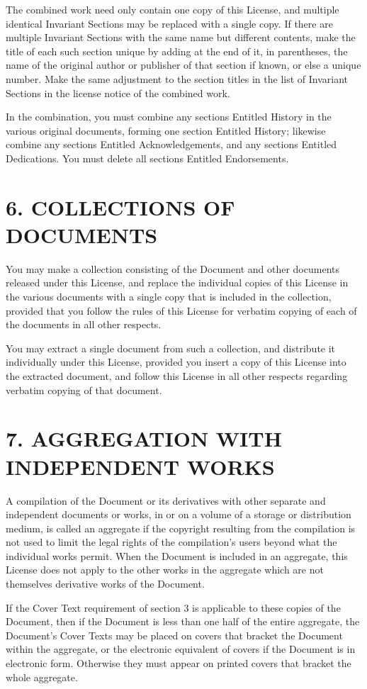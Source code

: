 \documentclass[captions=tableheading]{scrbook}
\begin{document}
The combined work need only contain one copy of this License, and multiple identical Invariant Sections may be replaced with a single copy. If there are multiple Invariant Sections with the same name but different contents, make the title of each such section unique by adding at the end of it, in parentheses, the name of the original author or publisher of that section if known, or else a unique number. Make the same adjustment to the section titles in the list of Invariant Sections in the license notice of the combined work.

In the combination, you must combine any sections Entitled History in the various original documents, forming one section Entitled History;
likewise combine any sections Entitled Acknowledgements, and any sections Entitled Dedications. You must delete all sections Entitled Endorsements.
\section{6. COLLECTIONS OF DOCUMENTS}
\label{sec-3-7}


You may make a collection consisting of the Document and other documents released under this License, and replace the individual copies of this License in the various documents with a single copy that is included in the collection, provided that you follow the rules of this License for verbatim copying of each of the documents in all other respects. 

You may extract a single document from such a collection, and distribute it individually under this License, provided you insert a copy of this License into the extracted document, and follow this License in all other respects regarding verbatim copying of that document.
\section{7. AGGREGATION WITH INDEPENDENT WORKS}
\label{sec-3-8}


A compilation of the Document or its derivatives with other separate and independent documents or works, in or on a volume of a storage or distribution medium, is called an aggregate if the copyright resulting from the compilation is not used to limit the legal rights of the compilation's users beyond what the individual works permit. When the Document is included in an aggregate, this License does not apply to the other works in the aggregate which are not themselves derivative works of the Document.

If the Cover Text requirement of section 3 is applicable to these copies of the Document, then if the Document is less than one half of the entire aggregate, the Document's Cover Texts may be placed on covers that bracket the Document within the aggregate, or the electronic equivalent of covers if the Document is in electronic form. Otherwise they must appear on printed covers that bracket the whole aggregate.
\end{document}
